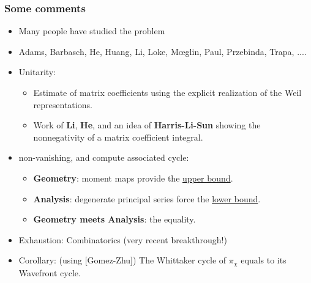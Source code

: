 \documentclass[t,mathserif,11pt,handout,usenames,dvipsnames]{beamer}
\theoremstyle{plain}
\theoremstyle{definition}
\def\red{\color{red}}
\def\lblue{\color{blue}}
\begin{document}
\begin{frame}[label=CG]
  \frametitle{Some comments}
  \begin{itemize}[<+->]
  \item Many people have studied the problem
  \item[] Adams, Barbasch,  He, Huang, Li, Loke, M\oe glin, Paul, Przebinda, Trapa,  ....
  \item {\lblue Unitarity}:
    \begin{itemize}
    \item Estimate of matrix coefficients using the explicit realization of the
      Weil representations.
    \item[] Work of {\bf Li}, {\bf He}, and an idea of {\bf Harris-Li-Sun} showing
      the {\lblue nonnegativity} of a matrix coefficient integral.
    \end{itemize}
  \item {\lblue non-vanishing}, and compute associated
    cycle:
    \begin{itemize}
    \item {\bf Geometry}: moment maps provide the \underline{upper bound}.
    \item {\bf Analysis}: degenerate principal series force the \underline{lower
        bound}.
    \item {\bf Geometry meets Analysis}: the equality.
    \end{itemize}
  \item {\lblue Exhaustion:} Combinatorics  {\red (very recent breakthrough!)} 
  \item {\lblue Corollary:} (using [Gomez-Zhu])
    The Whittaker cycle of $\pi_\chi$ equals to its Wavefront cycle. 
  \end{itemize}
\end{frame}
\end{document}
